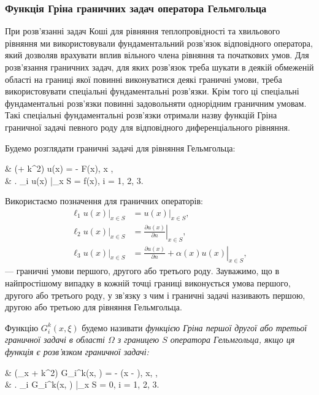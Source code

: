 \subsubsection{Функція Гріна граничних задач оператора Гельмгольца}

При розв'язанні задач Коші для рівняння теплопровідності та хвильового рівняння ми використовували фундаментальний розв'язок відповідного оператора, який дозволяв врахувати вплив вільного члена рівняння та початкових умов. Для розв'язання граничних задач, для яких розв'язок треба шукати в деякій обмеженій області на границі якої повинні виконуватися деякі граничні умови, треба використовувати спеціальні фундаментальні розв'язки. Крім того ці спеціальні фундаментальні розв'язки повинні задовольняти однорідним граничним умовам. Такі спеціальні фундаментальні розв'язки отримали назву функцій Гріна граничної задачі певного роду для відповідного диференціального рівняння. \medskip

\begin{example}
	Будемо розглядати граничні задачі для рівняння Гельмгольца:
	\begin{system}
		& (\Delta + k^2) u(x) = - F(x), \quad x \in \Omega, \\
		& \left. \ell_i u(x) \right|_{x \in S} = f(x), \quad i = 1, 2, 3.
	\end{system}
\end{example}

Використаємо позначення для граничних операторів:
\begin{align}
	\left. \ell_1 u(x) \right|_{x \in S} &= \left. u(x) \right|_{x \in S}, \\
	\left. \ell_2 u(x) \right|_{x \in S} &= \left. \frac{\partial u(x)}{\partial n} \right|_{x \in S}, \\
	\left. \ell_3 u(x) \right|_{x \in S} &= \left. \frac{\partial u(x)}{\partial n} + \alpha(x) u(x) \right|_{x \in S},
\end{align}
--- граничні умови першого, другого або третього роду. Зауважимо, що в найпростішому випадку в кожній точці границі виконується умова першого, другого або третього роду, у зв'язку з чим і граничні задачі називають першою, другою або третьою для рівняння Гельмгольца. \medskip

\begin{definition}
	Функцію $G_i^k(x, \xi)$ будемо називати \it{функцією Гріна} першої другої або третьої граничної задачі в області $\Omega$ з границею $S$ оператора Гельмгольца, якщо ця функція є розв'язком граничної задачі:
	\begin{system}
		& (\Delta_x + k^2) G_i^k(x, \xi) = - \delta(x - \xi), \quad x, \xi \in \Omega, \\
		& \left. \ell_i G_i^k(x, \xi) \right|_{x \in S} = 0, \quad i = 1, 2, 3.
	\end{system}
\end{definition}


